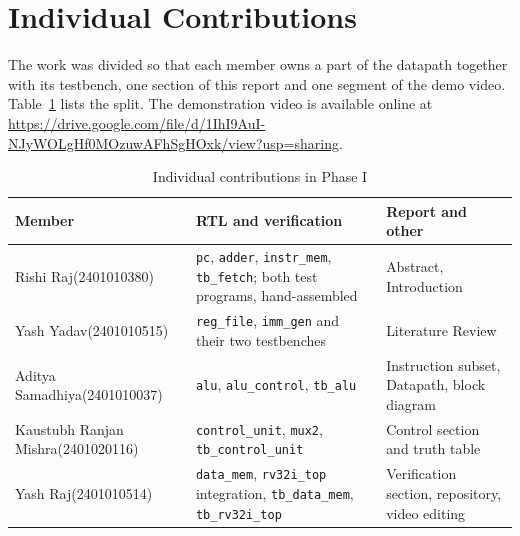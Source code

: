 \documentclass[conference]{IEEEtran}
\begin{document}
\section{Individual Contributions}
The work was divided so that each member owns a part of the datapath together
with its testbench, one section of this report and one segment of the demo
video. Table~\ref{tab:contrib} lists the split. The demonstration video is available online at \url{https://drive.google.com/file/d/1IhI9AuI-NJyWOLgHf0MOzuwAFhSgHOxk/view?usp=sharing}.

\begin{table}[!htb]
\caption{Individual contributions in Phase I}
\label{tab:contrib}
\centering
\setlength{\tabcolsep}{3pt}
\begin{tabular}{@{}p{2.3cm}>{\raggedright\arraybackslash}p{3.4cm}>{\raggedright\arraybackslash}p{2.3cm}@{}}
\toprule
Member & RTL and verification & Report and other \\
\midrule
Rishi Raj\newline(2401010380) & \texttt{pc}, \texttt{adder}, \texttt{instr\_mem}, \texttt{tb\_fetch};
           both test programs, hand-assembled & Abstract, Introduction \\
\addlinespace
Yash Yadav\newline(2401010515) & \texttt{reg\_file}, \texttt{imm\_gen} and their two testbenches &
           Literature Review \\
\addlinespace
Aditya Samadhiya\newline(2401010037) & \texttt{alu}, \texttt{alu\_control}, \texttt{tb\_alu} &
           Instruction subset, Datapath, block diagram \\
\addlinespace
Kaustubh Ranjan Mishra\newline(2401020116) & \texttt{control\_unit}, \texttt{mux2}, \texttt{tb\_control\_unit} &
           Control section and truth table \\
\addlinespace
Yash Raj\newline(2401010514) & \texttt{data\_mem}, \texttt{rv32i\_top} integration,
           \texttt{tb\_data\_mem}, \texttt{tb\_rv32i\_top} &
           Verification section, repository, video editing \\
\bottomrule
\end{tabular}
\end{table}
\end{document}

